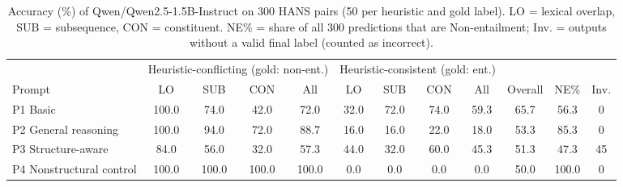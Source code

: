 \begin{table}[t]
\centering
\small
\begin{tabular}{l cccc cccc c c c}
\toprule
 & \multicolumn{4}{c}{Heuristic-conflicting (gold: non-ent.)} & \multicolumn{4}{c}{Heuristic-consistent (gold: ent.)} & & & \\
\cmidrule(lr){2-5}\cmidrule(lr){6-9}
Prompt & LO & SUB & CON & All & LO & SUB & CON & All & Overall & NE\% & Inv. \\
\midrule
P1 Basic & 100.0 & 74.0 & 42.0 & 72.0 & 32.0 & 72.0 & 74.0 & 59.3 & 65.7 & 56.3 & 0 \\
P2 General reasoning & 100.0 & 94.0 & 72.0 & 88.7 & 16.0 & 16.0 & 22.0 & 18.0 & 53.3 & 85.3 & 0 \\
P3 Structure-aware & 84.0 & 56.0 & 32.0 & 57.3 & 44.0 & 32.0 & 60.0 & 45.3 & 51.3 & 47.3 & 45 \\
P4 Nonstructural control & 100.0 & 100.0 & 100.0 & 100.0 & 0.0 & 0.0 & 0.0 & 0.0 & 50.0 & 100.0 & 0 \\
\bottomrule
\end{tabular}
\caption{Accuracy (\%) of Qwen/Qwen2.5-1.5B-Instruct on 300 HANS pairs (50 per heuristic and gold label). LO = lexical overlap, SUB = subsequence, CON = constituent. NE\% = share of all 300 predictions that are Non-entailment; Inv. = outputs without a valid final label (counted as incorrect).}
\label{tab:main}
\end{table}
